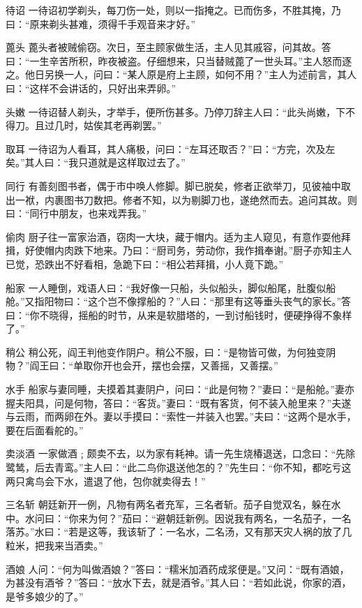 \documentclass[12pt,UTF8]{ctexbook}
\begin{document}
待诏
一待诏初学剃头，每刀伤一处，则以一指掩之。已而伤多，不胜其掩，乃曰：“原来剃头甚难，须得千手观音来才好。”

蓖头
蓖头者被贼偷窃。次日，至主顾家做生活，主人见其戚容，问其故。答曰：“一生辛苦所积，昨夜被盗。仔细想来，只当替贼蓖了一世头耳。”主人怒而逐之。他日另换一人，问曰：“某人原是府上主顾，如何不用？”主人为述前言，其人曰：“这样不会讲话的，只好出来弄卵。”

头嫩
一待诏替人剃头，才举手，便所伤甚多。乃停刀辞主人曰：“此头尚嫩，下不得刀。且过几时，姑俟其老再剃罢。”

取耳
一待诏为人看耳，其人痛极，问曰：“左耳还取否？”曰：“方完，次及左矣。”其人曰：“我只道就是这样取过去了。”

同行
有善刻图书者，偶于市中唤人修脚。脚已脱矣，修者正欲举刀，见彼袖中取出一袱，内裹图书刀数把。修者不知，以为剔脚刀也，遂绝然而去。追问其故。则曰：“同行中朋友，也来戏弄我。”

偷肉
厨子往一富家治酒，窃肉一大块，藏于帽内。适为主人窥见，有意作耍他拜揖，好使帽内肉跌下地来。乃曰：“厨司务，劳动你，我作揖奉谢。”厨子亦知主人已觉，恐跌出不好看相，急跪下曰：“相公若拜揖，小人竟下跪。”

船家
一人睡倒，戏语人曰：“我好像一只船，头似船头，脚似船尾，肚腹似船舱。”又指阳物曰：“这个岂不像撑船的？”人曰：“那里有这等垂头丧气的家长。”答曰：“你不晓得，摇船的时节，从来是软腊塔的，一到讨船钱时，便硬挣得不象样了。”

稍公
稍公死，阎王判他变作阴户。稍公不服，曰：“是物皆可做，为何独变阴物？”阎王曰：“单取你开也会开，摆也会摆，又善摇，又善摆。”

水手
船家与妻同睡，夫摸着其妻阴户，问曰：“此是何物？”妻曰：“是船舱。”妻亦握夫阳具，问是何物，答曰：“客货。”妻曰：“既有客货，何不装入舱里来？”夫遂与云雨，而两卵在外。妻以手摸曰：“索性一并装入也罢。”夫曰：“这两个是水手，要在后面看舵的。”

卖淡酒
一家做酒﹔颇卖不去，以为家有耗神。请一先生烧椿退送，口念曰：“先除鹭鸶，后去青鸾。”主人曰：“此二鸟你退送他怎的？”先生曰：“你不知，都吃亏这两只禽鸟会下水，遣退了他，包你就卖得去！”

三名斩
朝廷新开一例，凡物有两名者充军，三名者斩。茄子自觉双名，躲在水中。水问曰：“你来为何？”茄曰：“避朝廷新例。因说我有两名，一名茄子，一名落苏。”水曰：“若是这等，我该斩了：一名水，二名汤，又有那天灾人祸的放了几粒米，把我来当酒卖。”

酒娘
人问：“何为叫做酒娘？”答曰：“糯米加酒药成浆便是。”又问：“既有酒娘，为甚没有酒爷？”答曰：“放水下去，就是酒爷。”其人曰：“若如此说，你家的酒，是爷多娘少的了。”
\end{document}
